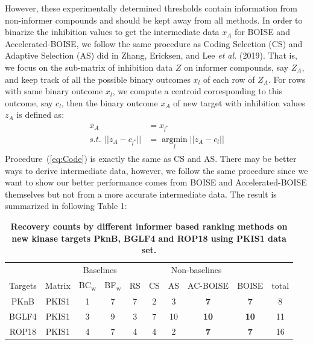 \documentclass[12pt]{article}
\DeclareMathOperator*{\argmin}{argmin}
\begin{document}
However, these experimentally determined thresholds contain information from non-informer compounds and should be kept away from all methods. In order to binarize the inhibition values to get the intermediate data $x_A$ for BOISE and Accelerated-BOISE, we follow the same procedure as Coding Selection (CS) and Adaptive Selection (AS) did in Zhang, Ericksen, and Lee {\em et al.} (2019). That is, we focus on the sub-matrix of inhibition data $Z$ on informer compounds, say $Z_A$, and keep track of all the possible binary outcomes $x_l$ of each row of $Z_A$. For rows with same binary outcome $x_l$, we compute a centroid corresponding to this outcome, say $c_l$, then the binary outcome $x_A$ of new target with inhibition values $z_A$ is defined as:
\begin{align}
    \label{eq:Code}
    \begin{split}
        x_A &= x_{l^*} \\
        s.t.\,~ ||z_A - c_{l^*}|| &= \argmin\limits_{l} ||z_A-c_l||
    \end{split}
\end{align}
Procedure~(\ref{eq:Code}) is exactly the same as CS and AS. There may be better ways to derive intermediate data, however, we follow the same procedure since we want to show our better performance comes from BOISE and Accelerated-BOISE themselves but not from a more accurate intermediate data. The result is summarized in following Table 1:
\bigskip
\begin{table}[ht!]
\centering
\caption{\label{tbl:t1}
{\bf Recovery counts by different informer based ranking methods on new kinase targets PknB, BGLF4 and ROP18 using PKIS1 data set.}}

\begin{tabular}{ cccccccccc }
\multicolumn{2}{l}{} & \multicolumn{2}{c}{Baselines} & \multicolumn{5}{c}{Non-baselines} \\
\multicolumn{1}{c}{Targets} & \multicolumn{1}{c}{Matrix} & \multicolumn{1}{c}{BC\textsubscript{w}} & \multicolumn{1}{c}{BF\textsubscript{w}} & \multicolumn{1}{c}{RS} & 
\multicolumn{1}{c}{CS} & 
\multicolumn{1}{c}{AS} & 
\multicolumn{1}{c}{AC-BOISE} &
\multicolumn{1}{c}{BOISE} & \multicolumn{1}{c}{total} \\
 \hline
 PKnB & PKIS1 & 1 & 7 & 7 & 2& 3 & \textbf{7} &\textbf{7} & 8 \\
 BGLF4 & PKIS1 & 3 & 9 & 3 & 7 & 10 & \textbf{10} &\textbf{10} & 11 \\
 ROP18 & PKIS1 & 4 & 7 & 4 & 4 & 2 & \textbf{7} & \textbf{7} &16 \\
\end{tabular}\\
\end{table}
\bigskip
\end{document}
